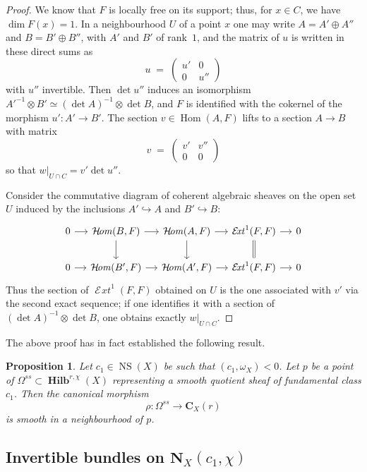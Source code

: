 \documentclass[12pt,english]{smfart}%
\theoremstyle{plain}
\newtheorem{proposition}[theorem]{Proposition}
\theoremstyle{definition}
\theoremstyle{remark}
\DeclareMathOperator{\Hom}{Hom}
\DeclareMathOperator{\NS}{NS}
\DeclareMathOperator{\Hilb}{\mathbf{Hilb}}
\newcommand{\Homsh}{\mathop{\mathcal{H}\!\mathit{om}}\nolimits}
\newcommand{\Extsh}{\mathop{\mathcal{E}\!\mathit{xt}}\nolimits}
\newcommand{\origpage}[1]{\marginnote{\scriptsize\itshape p.~#1}}
\begin{document}
\begin{proof}
We know that $F$ is locally free on its support; thus, for $x\in C$, we have $\dim F(x)=1$. In a neighbourhood $U$ of a point $x$ one may write $A=A'\oplus A''$ and $B=B'\oplus B''$, with $A'$ and $B'$ of rank~$1$, and the matrix of $u$ is written in these direct sums as
\[
u \;=\; \begin{pmatrix} u' & 0 \\ 0 & u'' \end{pmatrix}
\]
with $u''$ invertible. Then $\det u''$ induces an isomorphism $A'^{-1}\otimes B' \simeq (\det A)^{-1}\otimes\det B$, and $F$ is identified with the cokernel of the morphism $u':A'\to B'$. The section $v\in\Hom(A,F)$ lifts to a section $A\to B$ with matrix
\[
v \;=\; \begin{pmatrix} v' & v'' \\ 0 & 0 \end{pmatrix}
\]
so that $w|_{U\cap C}=v'\det u''$.

Consider the commutative diagram of coherent algebraic sheaves on the open set $U$ induced by the inclusions $A'\hookrightarrow A$ and $B'\hookrightarrow B$:
\[
\begin{tikzcd}[column sep=small]
0 \arrow[r] & \Homsh(B,F) \arrow[r]\arrow[d] & \Homsh(A,F) \arrow[r]\arrow[d]
  & \Extsh^{1}(F,F) \arrow[r]\arrow[d,equal] & 0 \\
0 \arrow[r] & \Homsh(B',F) \arrow[r] & \Homsh(A',F) \arrow[r]
  & \Extsh^{1}(F,F) \arrow[r] & 0
\end{tikzcd}
\]
\origpage{642}%
Thus the section of $\Extsh^{1}(F,F)$ obtained on $U$ is the one associated with $v'$ via the second exact sequence; if one identifies it with a section of $(\det A)^{-1}\otimes\det B$, one obtains exactly $w|_{U\cap C}$.
\end{proof}

The above proof has in fact established the following result.

\begin{proposition}\label{prop:rho-smooth}
Let $c_{1}\in\NS(X)$ be such that $(c_{1},\omega_{X})<0$. Let $p$ be a point of $\Omega^{ss}\subset \Hilb^{r,\chi}(X)$ representing a smooth quotient sheaf of fundamental class $c_{1}$. Then the canonical morphism
\[
\rho : \Omega^{ss} \longrightarrow \mathbf{C}_{X}(r)
\]
is smooth in a neighbourhood of $p$.
\end{proposition}

\subsection{Invertible bundles on \texorpdfstring{$\mathbf{N}_{X}(c_{1},\chi)$}{N\_X(c1,chi)}}\label{subsec:invertible}
\end{document}
